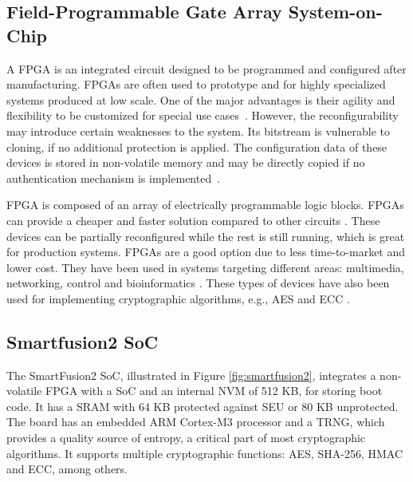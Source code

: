 \subsection{Field-Programmable Gate Array System-on-Chip}\label{chap:background:computing:fpga}

A \ac{FPGA} is an integrated circuit designed to be programmed and configured after manufacturing. \ac{FPGA}s are often used to prototype and for highly specialized systems produced at low scale. One of the major advantages is their agility and flexibility to be customized for special use cases~\cite{cyberphysicalsystems}. However, the reconfigurability may introduce certain weaknesses to the system. Its bitstream is vulnerable to cloning, if no additional protection is applied. The configuration data of these devices is stored in non-volatile memory and may be directly copied if no authentication mechanism is implemented~\cite{drimer2007authentication}.

FPGA is composed of an array of electrically programmable logic blocks. FPGAs can provide a cheaper and faster solution compared to other circuits \cite{farooq2012fpga}. These devices can be partially reconfigured while the rest is still running, which is great for production systems. FPGAs are a good option due to less time-to-market and lower cost. They have been used in systems targeting different areas: multimedia, networking, control and bioinformatics \cite{dorta2009overview}.
These types of devices have also been used for implementing cryptographic algorithms, e.g., AES and ECC \cite{wolf2011design}.

\subsection*{Smartfusion2 SoC}\label{chap:background:computing:smartfusion}

The SmartFusion2 \ac{SoC}, illustrated in Figure \ref{fig:smartfusion2}, integrates a non-volatile \ac{FPGA} with a \ac{SoC} and an internal \ac{NVM} of 512 KB, for storing boot code.
It has a \ac{SRAM} with 64 KB protected against \ac{SEU} or 80 KB unprotected. The board has an embedded ARM Cortex-M3 processor and a \ac{TRNG}, which provides a quality source of entropy, a critical part of most cryptographic algorithms. It supports multiple cryptographic functions: \ac{AES}, \ac{SHA}-256, \ac{HMAC} and \ac{ECC}, among others.

